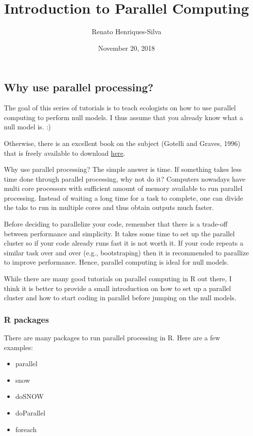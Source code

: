 \documentclass[]{article}
\title{Introduction to Parallel Computing}
\author{Renato Henriques-Silva}
\date{November 20, 2018}
\providecommand{\tightlist}{%
  \setlength{\itemsep}{0pt}\setlength{\parskip}{0pt}}
\begin{document}
\maketitle

{
\setcounter{tocdepth}{2}
\tableofcontents
}
\subsection{Why use parallel
processing?}\label{why-use-parallel-processing}

The goal of this series of tutorials is to teach ecologists on how to
use parallel computing to perform null models. I thus assume that you
already know what a null model is. :)

Otherwise, there is an excellent book on the subject (Gotelli and
Graves, 1996) that is freely available to download
\href{https://www.uvm.edu/~ngotelli/nullmodelspage.html}{here}.

Why use parallel processing? The simple answer is time. If something
takes less time done through parallel processing, why not do it?
Computers nowadays have multi core processors with sufficient amount of
memory available to run parallel processing. Instead of waiting a long
time for a task to complete, one can divide the taks to run in multiple
cores and thus obtain outputs much faster.

Before deciding to parallelize your code, remember that there is a
trade-off between performance and simplicity. It takes some time to set
up the parallel cluster so if your code already runs fast it is not
worth it. If your code repeats a similar task over and over (e.g.,
bootstraping) then it is recommended to parallize to improve
performance. Hence, parallel computing is ideal for null models.

While there are many good tutorials on parallel computing in R out
there, I think it is better to provide a small introduction on how to
set up a parallel cluster and how to start coding in parallel before
jumping on the null models.

\subsubsection{R packages}\label{r-packages}

There are many packages to run parallel processing in R. Here are a few
examples:

\begin{itemize}
\tightlist
\item
  parallel
\item
  snow
\item
  doSNOW
\item
  doParallel
\item
  foreach
\end{itemize}
\end{document}
